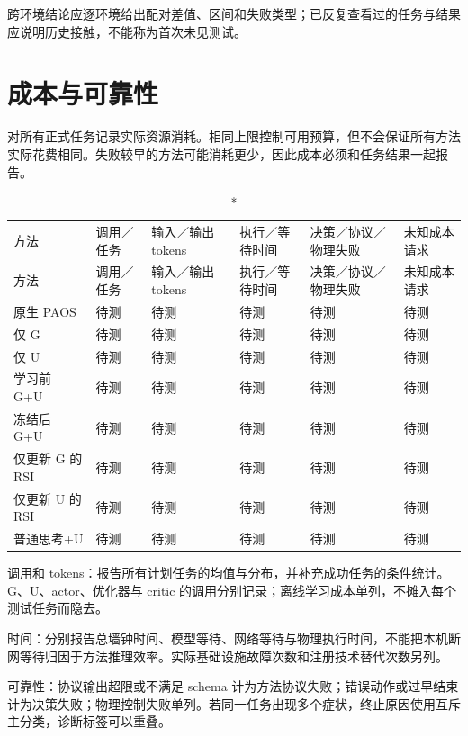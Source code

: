 \documentclass[UTF8,10pt,a4paper]{ctexart}
\begin{document}
跨环境结论应逐环境给出配对差值、区间和失败类型；已反复查看过的任务与结果应说明历史接触，不能称为首次未见测试。

\clearpage
\section*{成本与可靠性}
对所有正式任务记录实际资源消耗。相同上限控制可用预算，但不会保证所有方法实际花费相同。失败较早的方法可能消耗更少，因此成本必须和任务结果一起报告。
\begin{small}
\begin{longtable}{>{\raggedright\arraybackslash}p{3.30cm}>{\raggedright\arraybackslash}p{2.24cm}>{\raggedright\arraybackslash}p{2.56cm}>{\raggedright\arraybackslash}p{2.45cm}>{\raggedright\arraybackslash}p{2.34cm}>{\raggedright\arraybackslash}p{1.81cm}}
\caption*{表 8 正式测试的效率与可靠性预留表}\\
\toprule
方法 & 调用／任务 & 输入／输出 tokens & 执行／等待时间 & 决策／协议／物理失败 & 未知成本请求\\\midrule
\endfirsthead
\toprule
方法 & 调用／任务 & 输入／输出 tokens & 执行／等待时间 & 决策／协议／物理失败 & 未知成本请求\\\midrule
\endhead
原生 PAOS & 待测 & 待测 & 待测 & 待测 & 待测\\
仅 G & 待测 & 待测 & 待测 & 待测 & 待测\\
仅 U & 待测 & 待测 & 待测 & 待测 & 待测\\
学习前 G+U & 待测 & 待测 & 待测 & 待测 & 待测\\
冻结后 G+U & 待测 & 待测 & 待测 & 待测 & 待测\\
仅更新 G 的 RSI & 待测 & 待测 & 待测 & 待测 & 待测\\
仅更新 U 的 RSI & 待测 & 待测 & 待测 & 待测 & 待测\\
普通思考+U & 待测 & 待测 & 待测 & 待测 & 待测\\
\bottomrule
\end{longtable}
\end{small}
调用和 tokens：报告所有计划任务的均值与分布，并补充成功任务的条件统计。G、U、actor、优化器与 critic 的调用分别记录；离线学习成本单列，不摊入每个测试任务而隐去。

时间：分别报告总墙钟时间、模型等待、网络等待与物理执行时间，不能把本机断网等待归因于方法推理效率。实际基础设施故障次数和注册技术替代次数另列。

可靠性：协议输出超限或不满足 schema 计为方法协议失败；错误动作或过早结束计为决策失败；物理控制失败单列。若同一任务出现多个症状，终止原因使用互斥主分类，诊断标签可以重叠。
\end{document}
